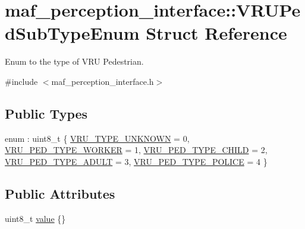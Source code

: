\hypertarget{structmaf__perception__interface_1_1VRUPedSubTypeEnum}{}\section{maf\+\_\+perception\+\_\+interface\+:\+:V\+R\+U\+Ped\+Sub\+Type\+Enum Struct Reference}
\label{structmaf__perception__interface_1_1VRUPedSubTypeEnum}


Enum to the type of V\+RU Pedestrian.  




{\ttfamily \#include $<$maf\+\_\+perception\+\_\+interface.\+h$>$}

\subsection*{Public Types}
\begin{DoxyCompactItemize}
\item 
enum \+: uint8\+\_\+t \{ \newline
\hyperlink{structmaf__perception__interface_1_1VRUPedSubTypeEnum_a411ad32a46fd4f605d199de4d383c500a5ffb5107cfe57cade0dc92c44154a7a7}{V\+R\+U\+\_\+\+T\+Y\+P\+E\+\_\+\+U\+N\+K\+N\+O\+WN} = 0, 
\hyperlink{structmaf__perception__interface_1_1VRUPedSubTypeEnum_a411ad32a46fd4f605d199de4d383c500a3bd8130ffed8cbc23a54cc2383341b2a}{V\+R\+U\+\_\+\+P\+E\+D\+\_\+\+T\+Y\+P\+E\+\_\+\+W\+O\+R\+K\+ER} = 1, 
\hyperlink{structmaf__perception__interface_1_1VRUPedSubTypeEnum_a411ad32a46fd4f605d199de4d383c500adeb5ee55189ef4f9f71d39a5b9ddc3f2}{V\+R\+U\+\_\+\+P\+E\+D\+\_\+\+T\+Y\+P\+E\+\_\+\+C\+H\+I\+LD} = 2, 
\hyperlink{structmaf__perception__interface_1_1VRUPedSubTypeEnum_a411ad32a46fd4f605d199de4d383c500af8a89fd67f0aed352d5ca78d407310d9}{V\+R\+U\+\_\+\+P\+E\+D\+\_\+\+T\+Y\+P\+E\+\_\+\+A\+D\+U\+LT} = 3, 
\newline
\hyperlink{structmaf__perception__interface_1_1VRUPedSubTypeEnum_a411ad32a46fd4f605d199de4d383c500ae64250e544cf026a90173ae86f73a7a1}{V\+R\+U\+\_\+\+P\+E\+D\+\_\+\+T\+Y\+P\+E\+\_\+\+P\+O\+L\+I\+CE} = 4
 \}
\end{DoxyCompactItemize}
\subsection*{Public Attributes}
\begin{DoxyCompactItemize}
\item 
uint8\+\_\+t \hyperlink{structmaf__perception__interface_1_1VRUPedSubTypeEnum_a559e3bc544799fd49a031ccde22a5219}{value} \{\}
\end{DoxyCompactItemize}


